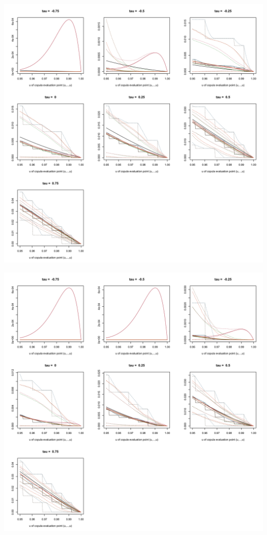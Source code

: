 \documentclass[12pt]{report}
\newcommand{\1}{\mathbf{1}}
\begin{document}
\begin{flushleft}
\begin{center}
\label{t4_2d_s}
\includegraphics[width=17cm]{ExceedanceProb/t4_2d_s.png}
\end{center}%

\begin{center}
\label{N_2d_s}
\includegraphics[width=17cm]{ExceedanceProb/N_2d_s.png}
\end{center}%


\end{flushleft}
\end{document}
